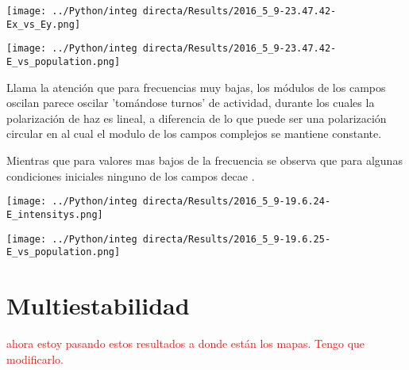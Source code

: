 			\begin{minipage}{0.5\textwidth}
				
				\centering
				\texttt{[image: ../Python/integ directa/Results/2016\_5\_9-23.47.42-Ex\_vs\_Ey.png]}
				
			\end{minipage}
			\begin{minipage}{0.5\textwidth}
				
				\centering
				\texttt{[image: ../Python/integ directa/Results/2016\_5\_9-23.47.42-E\_vs\_population.png]}
				
			\end{minipage}
			
			Llama la atención que para frecuencias muy bajas, los módulos de los campos oscilan parece oscilar 'tomándose turnos' de actividad, durante los cuales la polarización de haz es lineal, a diferencia de lo que puede ser una polarización circular en al cual el modulo de los campos complejos se mantiene constante.
			
			
			Mientras que para valores mas bajos de la frecuencia se observa que para algunas condiciones iniciales ninguno de los campos decae .
			
			\begin{minipage}{0.5\textwidth}
				
				\centering
				\texttt{[image: ../Python/integ directa/Results/2016\_5\_9-19.6.24-E\_intensitys.png]}
				
			\end{minipage}
			\begin{minipage}{0.5\textwidth}
				
				\centering
				\texttt{[image: ../Python/integ directa/Results/2016\_5\_9-19.6.25-E\_vs\_population.png]}
				
			\end{minipage}
		
		
		
	\section{Multiestabilidad}
		\textcolor{red}{ahora estoy pasando estos resultados a donde están los mapas. Tengo que modificarlo.}
		
